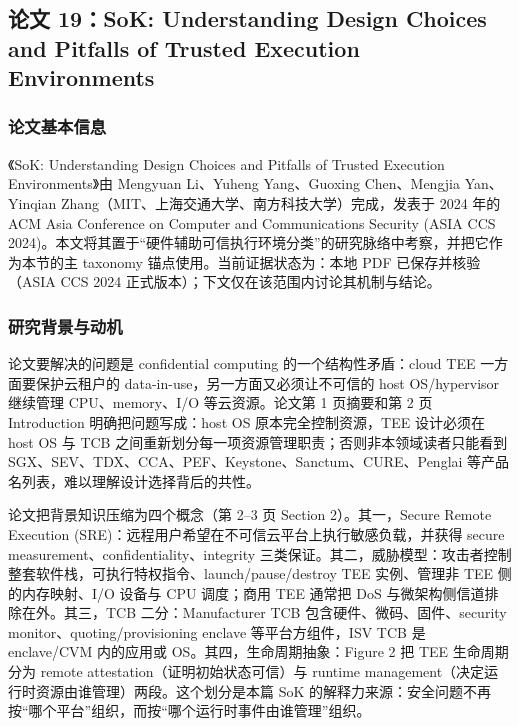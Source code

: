 \documentclass[11pt]{ctexart}
\begin{document}
\subsection{论文 19：SoK: Understanding Design Choices and Pitfalls of Trusted Execution Environments}
\subsubsection{论文基本信息}
《SoK: Understanding Design Choices and Pitfalls of Trusted Execution Environments》由 Mengyuan Li、Yuheng Yang、Guoxing Chen、Mengjia Yan、Yinqian Zhang（MIT、上海交通大学、南方科技大学）完成，发表于 2024 年的 ACM Asia Conference on Computer and Communications Security (ASIA CCS 2024)。本文将其置于``硬件辅助可信执行环境分类''的研究脉络中考察，并把它作为本节的主 taxonomy 锚点使用。当前证据状态为：本地 PDF 已保存并核验（ASIA CCS 2024 正式版本）；下文仅在该范围内讨论其机制与结论。\cite{li2024sokteechoices}\par
\subsubsection{研究背景与动机}
论文要解决的问题是 confidential computing 的一个结构性矛盾：cloud TEE 一方面要保护云租户的 data-in-use，另一方面又必须让不可信的 host OS/hypervisor 继续管理 CPU、memory、I/O 等云资源。论文第 1 页摘要和第 2 页 Introduction 明确把问题写成：host OS 原本完全控制资源，TEE 设计必须在 host OS 与 TCB 之间重新划分每一项资源管理职责；否则非本领域读者只能看到 SGX、SEV、TDX、CCA、PEF、Keystone、Sanctum、CURE、Penglai 等产品名列表，难以理解设计选择背后的共性。\par
论文把背景知识压缩为四个概念（第 2--3 页 Section 2）。其一，Secure Remote Execution (SRE)：远程用户希望在不可信云平台上执行敏感负载，并获得 secure measurement、confidentiality、integrity 三类保证。其二，威胁模型：攻击者控制整套软件栈，可执行特权指令、launch/pause/destroy TEE 实例、管理非 TEE 侧的内存映射、I/O 设备与 CPU 调度；商用 TEE 通常把 DoS 与微架构侧信道排除在外。其三，TCB 二分：Manufacturer TCB 包含硬件、微码、固件、security monitor、quoting/provisioning enclave 等平台方组件，ISV TCB 是 enclave/CVM 内的应用或 OS。其四，生命周期抽象：Figure 2 把 TEE 生命周期分为 remote attestation（证明初始状态可信）与 runtime management（决定运行时资源由谁管理）两段。这个划分是本篇 SoK 的解释力来源：安全问题不再按``哪个平台''组织，而按``哪个运行时事件由谁管理''组织。\par
\end{document}
